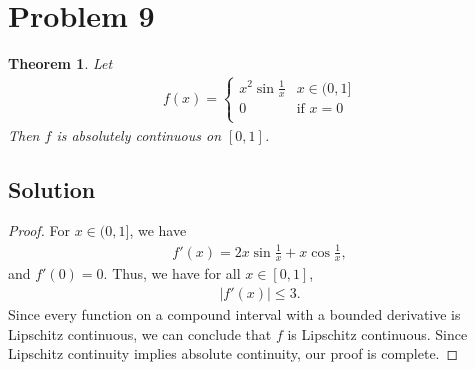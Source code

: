 \documentclass[10pt,a4paper]{article}
\theoremstyle{theorem}
\newtheorem{theorem}{Theorem}
\theoremstyle{definition}
\begin{document}
\section*{Problem 9}
\begin{theorem}
Let 
\begin{align*}
f(x) = \begin{cases} 
      x^2 \sin\frac{1}{x} & x \in (0, 1] \\
     0 & \text{if } x=0 \\
\end{cases}
\end{align*}
Then $f$ is absolutely continuous on $[0, 1]$.
\end{theorem}

\subsection*{Solution}
\begin{proof}
For $x \in (0, 1]$, we have
\begin{align*}
f'(x) = 2x \sin \frac{1}{x} + x \cos \frac{1}{x},
\end{align*}
and $f'(0) = 0$. Thus, we have for all $x \in [0, 1]$, 
\begin{align*}
|f'(x)| \leq 3.
\end{align*}
Since every function on a compound interval with a bounded derivative is Lipschitz continuous, we can conclude that $f$ is Lipschitz continuous. Since Lipschitz continuity implies absolute continuity, our proof is complete.
\end{proof}
\end{document}
